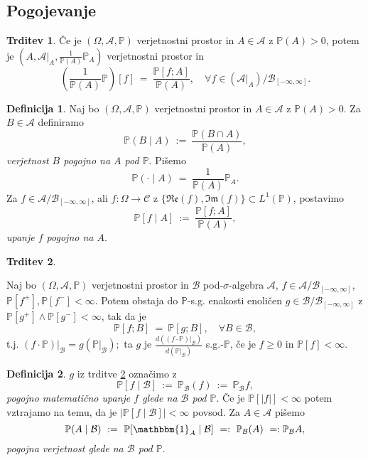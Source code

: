 \documentclass[11pt]{article}
\renewcommand{\P}{\mathbb{P}}
\newcommand{\A}{\mathcal{A}}
\newcommand{\BB}{\mathcal{B}}
\newcommand{\B}{\mathscr{B}}
\newcommand{\C}{\mathcal{C}}
\newcommand{\set}[1]{\{#1\}}
\newcommand{\oklepaj}[1]{\left(#1\right)}
\newcommand{\1}{\mathbbm{1}}
\newcommand{\rr}{[-\infty,\infty]}
\renewcommand{\Re}{\mathfrak{Re}}
\renewcommand{\Im}{\mathfrak{Im}}
\theoremstyle{definition}
\newtheorem{definicija}{Definicija}[section]
\theoremstyle{definition}
\newtheorem{trditev}{Trditev}[section]
\theoremstyle{definition}
\theoremstyle{definition}
\begin{document}

\subsection{Pogojevanje}
\vspace{0.5cm}

\begin{trditev}

Če je $(\Omega, \A, \P)$ verjetnostni prostor in $A \in \A$ z $\P(A)>0$, potem je $(A, \A\big|_A, \frac{1}{\P(A)}\P_A)$ verjetnostni prostor in
$$\oklepaj{\frac{1}{\P(A)}\P}[f] ~=~ \frac{\P[f;A]}{\P(A)}, \quad \forall f \in \oklepaj{\A\big|_A}/\B_{\rr}.$$

\end{trditev}
\vspace{0.5cm}

\begin{definicija}

Naj bo $(\Omega, \A, \P)$ verjetnostni prostor in $A \in \A$ z $\P(A)>0$. Za $B \in \A$ definiramo
$$\P(B \mid A) ~:=~ \frac{\P(B \cap A)}{\P(A)},$$
\textit{verjetnost $B$ pogojno na $A$ pod $\P$}. Pišemo
$$\P(\cdot \mid A) ~=~ \frac{1}{\P(A)}\P_A.$$
Za $f \in \A/\B_{\rr}$, ali $f: \Omega \rightarrow \C$ z $\set{\Re(f), \Im(f)} \subset L^1(\P)$, postavimo
$$\P[f \mid A] ~:=~ \frac{\P[f;A]}{\P(A)},$$
\textit{upanje $f$ pogojno na $A$}.

\end{definicija}
\vspace{0.5cm}

\begin{trditev}\label{ref:3.10}

Naj bo $(\Omega, \A, \P)$ verjetnostni prostor in $\BB$ pod-$\sigma$-algebra $\A$, $f \in \A/\B_{\rr}$, $\P[f^+],\P[f^-]<\infty$. Potem obstaja do $\P$-s.g. enakosti enoličen $g \in \BB/\B_{\rr}$ z $\P[g^+]\wedge\P[g^-]<\infty$, tak da je
$$\P[f;B] ~=~ \P[g;B], \quad \forall B \in \BB,$$
t.j. $(f\cdot\P)\big|_\BB = g(\P\big|_\BB);$ ta $g$ je $\frac{d\oklepaj{(f\cdot\P)\big|_\BB}}{d\oklepaj{\P\big|_\BB}}$ s.g.-$\P$, če je $f\geq 0$ in $\P[f]<\infty$.

\end{trditev}
\vspace{0.5cm}

\begin{definicija}

$g$ iz trditve \ref{ref:3.10} označimo z 
$$\P[f \mid \BB] ~:=~ \P_\BB(f) ~:=~ \P_\BB f,$$ 
\textit{pogojno matematično upanje $f$ glede na $\BB$ pod $\P$}. Če je $\P[|f|]<\infty$ potem vztrajamo na temu, da je $|\P[f \mid \BB]|<\infty$ povsod. Za $A \in \A$ pišemo
$$\P(A \mid \BB) ~:=~ \P[\1_A \mid \BB] ~=:~ \P_\BB(A) ~=: \P_\BB A,$$
\textit{pogojna verjetnost glede na $\BB$ pod $\P$}. 

\end{definicija}
\vspace{0.5cm}
\end{document}
